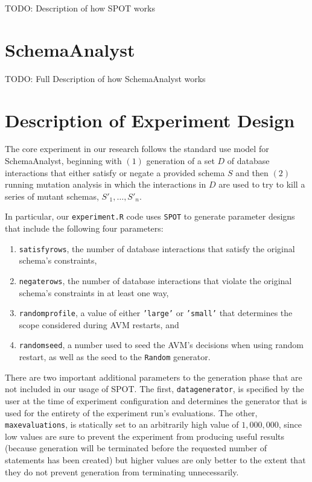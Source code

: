 \documentclass[a4paper,twocolumn]{article}
\begin{document}
TODO: Description of how SPOT works

\section{SchemaAnalyst} \label{sec:schemaanalyst}

TODO: Full Description of how SchemaAnalyst works

\section{Description of Experiment Design} \label{sec:exp-des}

The core experiment in our research follows the standard use model for SchemaAnalyst, beginning with $(1)$ generation of a set $D$ of database interactions that either satisfy or negate a provided schema $S$ and then $(2)$ running mutation analysis in which the interactions in $D$ are used to try to kill a series of mutant schemas, $S'_1, \dots, S'_n$.

In particular, our \texttt{experiment.R} code uses \texttt{SPOT} to generate parameter designs that include the following four parameters:
\begin{enumerate}
\item \texttt{satisfyrows}, the number of database interactions that satisfy the original schema's constraints,
\item \texttt{negaterows}, the number of database interactions that violate the original schema's constraints in at least one way,
\item \texttt{randomprofile}, a value of either \texttt{'large'} or \texttt{'small'} that determines the scope considered during AVM restarts, and
\item \texttt{randomseed}, a number used to seed the AVM's decisions when using random restart, as well as the seed to the \texttt{Random} generator.
\end{enumerate}

There are two important additional parameters to the generation phase that are not included in our usage of SPOT. The first, \texttt{datagenerator}, is specified by the user at the time of experiment configuration and determines the generator that is used for the entirety of the experiment run's evaluations. The other, \texttt{maxevaluations}, is statically set to an arbitrarily high value of $1,000,000$, since low values are sure to prevent the experiment from producing useful results (because generation will be terminated before the requested number of statements has been created) but higher values are only better to the extent that they do not prevent generation from terminating unnecessarily.
\end{document}
